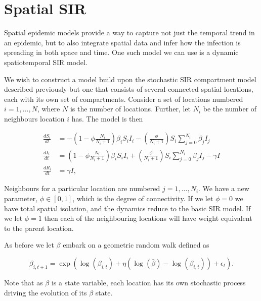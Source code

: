 
\section{Spatial SIR}

	Spatial epidemic models provide a way to capture not just the temporal trend in an epidemic, but to also integrate spatial data and infer how the infection is spreading in both space and time. One such model we can use is a dynamic spatiotemporal SIR model.

	We wish to construct a model build upon the stochastic SIR compartment model described previously but one that consists of several connected spatial locations, each with its own set of compartments. Consider a set of locations numbered $i = 1, ..., N$, where $N$ is the number of locations. Further, let $N_i$ be the number of neighbours location $i$ has. The model is then

	\begin{equation}
		\begin{aligned}
			\frac{dS_i}{dt} & = - \left( 1 - \phi \frac{N_i}{N_i + 1} \right) \beta_i S_i I_i - \left( \frac{\phi}{N_i + 1} \right) S_i \sum_{j = 0}^{N_i} \beta_j I_j \\
			\frac{dI_i}{dt} & = \left( 1 - \phi \frac{N_i}{N_i + 1} \right) \beta_i S_i I_i + \left( \frac{\phi}{N_i + 1} \right) S_i \sum_{j = 0}^{N_i} \beta_j I_j - \gamma I \\
			\frac{dR_i}{dt} & = \gamma I,
		\end{aligned}
	\end{equation}
    
	Neighbours for a particular location are numbered $j = 1, ..., N_i$. We have a new parameter, $\phi \in [0,1]$, which is the degree of connectivity. If we let $\phi = 0$ we have total spatial isolation, and the dynamics reduce to the basic SIR model. If we let $\phi = 1$ then each of the neighbouring locations will have weight equivalent to the parent location.

	As before we let $\beta$ embark on a geometric random walk defined as

	\begin{equation}
		\beta_{i, t+1} = \exp \left( \log(\beta_{i, t}) + \eta (\log(\bar{\beta}) - \log(\beta_{i, t})) + \epsilon_{t} \right).
	\end{equation}
	
	Note that as $\beta$ is a state variable, each location has its own stochastic process driving the evolution of its $\beta$ state.

